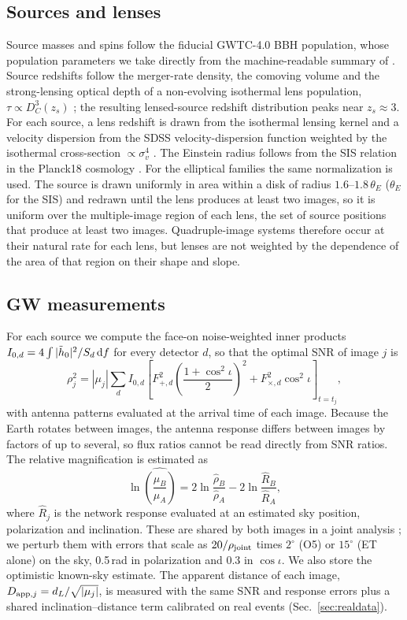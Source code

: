 \subsection{Sources and lenses}
Source masses and spins follow the fiducial GWTC-4.0 BBH population, whose population parameters we take directly from the machine-readable summary of \citet{lvk2025gwtc4pop}. Source redshifts follow the merger-rate density, the comoving volume and the strong-lensing optical depth of a non-evolving isothermal lens population, $\tau\propto D_C^3(z_s)$ \citep{turner1984statistics}; the resulting lensed-source redshift distribution peaks near $z_s\approx3$. For each source, a lens redshift is drawn from the isothermal lensing kernel and a velocity dispersion from the SDSS velocity-dispersion function weighted by the isothermal cross-section $\propto\sigma_v^4$ \citep{choi2007vdf,haris2018identifying}. The Einstein radius follows from the SIS relation in the Planck18 cosmology \citep{planck2020cosmology}. For the elliptical families the same normalization is used. The source is drawn uniformly in area within a disk of radius $1.6$--$1.8\,\theta_E$ ($\theta_E$ for the SIS) and redrawn until the lens produces at least two images, so it is uniform over the multiple-image region of each lens, the set of source positions that produce at least two images. Quadruple-image systems therefore occur at their natural rate for each lens, but lenses are not weighted by the dependence of the area of that region on their shape and slope.

\subsection{GW measurements}
\label{sec:gwmeas}
For each source we compute the face-on noise-weighted inner products $I_{0,d}=4\int|\tilde h_0|^2/S_d\,{\rm d}f$ for every detector $d$, so that the optimal SNR of image $j$ is
\begin{equation}
\rho_j^2=|\mu_j|\sum_d I_{0,d}\left[F_{+,d}^2\left(\frac{1+\cos^2\iota}{2}\right)^2+F_{\times,d}^2\cos^2\iota\right]_{t=t_j},
\end{equation}
with antenna patterns evaluated at the arrival time of each image. Because the Earth rotates between images, the antenna response differs between images by factors of up to several, so flux ratios cannot be read directly from SNR ratios. The relative magnification is estimated as
\begin{equation}
\ln\widehat{\left(\frac{\mu_B}{\mu_A}\right)}=2\ln\frac{\hat\rho_B}{\hat\rho_A}-2\ln\frac{\hat R_B}{\hat R_A},
\end{equation}
where $\hat R_j$ is the network response evaluated at an estimated sky position, polarization and inclination. These are shared by both images in a joint analysis \citep{janquart2023golum,lo2023bayesian}; we perturb them with errors that scale as $20/\rho_{\rm joint}$ times $2^\circ$ (O5) or $15^\circ$ (ET alone) on the sky, 0.5\,rad in polarization and 0.3 in $\cos\iota$. We also store the optimistic known-sky estimate. The apparent distance of each image, $D_{{\rm app},j}=d_L/\sqrt{|\mu_j|}$, is measured with the same SNR and response errors plus a shared inclination--distance term calibrated on real events (Sec.~\ref{sec:realdata}).

